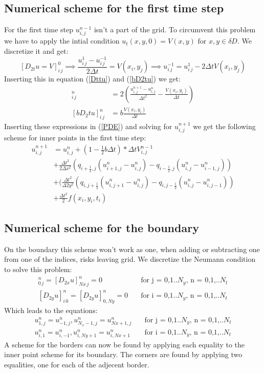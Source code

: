 \documentclass[twoside]{article}
\begin{document}
\subsection{Numerical scheme for the first time step}
For the first time step $u^{n-1}_{i,j}$ isn't a part of the grid. To circumvent this problem we have to apply the intial condition $u_t(x,y,0) = V(x,y) \text{ for } x,y \in \delta D$. We discretize it and get:
$$[D_{2t} u = V]_{i\,j}^0 \implies \frac{u_{i\,j}^1 - u_{i\,j}^{-1}}{2\Delta t} = V(x_i,y_j) \implies u_{i\,j}^{-1} = u_{i\,j}^{1} - 2\Delta t V(x_i,y_j)$$
Inserting this in equation (\ref{Dttu}) and (\ref{bD2tu}) we get:
\begin{align}
[D_t D_t u]_{i\, j}^n &= 2(\frac{u^{n+1}_{i,j} - u^{n}_{i,j}}{\Delta t^2}  - \frac{V(x_i,y_i)}{\Delta t}) \\
[bD_2t u]_{i\, j}^n &= b\frac{V(x_i,y_i)}{\Delta t} \label{bD2tu}
\end{align}
Inserting these expressions in (\ref{PDE}) and solving for $u^{n+1}_{i,j}$ we get the following scheme for inner points in the first time step:
\begin{align*}
u^{n+1}_{i,j} &= u^{n}_{i,j} + (1 - \frac{1}{2}b\Delta t)*\Delta t V^{n-1}_{i,j} \\
&+ \frac{\Delta t^2}{2\Delta x^2}({q_{i +\frac{1}{2},j}(u^{n}_{i+1,j} - u^{n}_{i,j}) - q_{i -\frac{1}{2},j}(u^{n}_{i,j} - u^{n}_{i-1,j})}) \\ 
&+  (\frac{\Delta t^2}{\Delta 2y^2} (q_{i,j +\frac{1}{2}}(u^{n}_{i,j+1} - u^{n}_{i,j}) - q_{i ,j-\frac{1}{2}}(u^{n}_{i,j} - u^{n}_{i,j-1}))\\
 &+ \frac{\Delta t^2}{2} f(x_i, y_i, t_i)
\end{align*}


\subsection{Numerical scheme for the boundary}
On the boundary this scheme won't work as one, when adding or subtracting one from one of the indices, risks leaving grid. We discretize the Neumann condition to solve this problem:
\begin{align}
[D_{2x} u]_{0\, j}^n = [D_{2x} u]_{Nx\, j}^n = 0 & \quad \text{for j = 0,1..$N_y$, n = 0,1,..$N_t$} \\
[D_{2y} u]_{i\, 0}^n = [D_{2y} u]_{0,Ny}^n = 0 & \quad \text{for i = 0,1..$N_y$, n = 0,1,..$N_t$}
\end{align}
Which leads to the equations:
\begin{align}
u_{1,j}^n = u_{-1,j}^n ,  u_{N_x-1,j}^n = u_{Nx+1,j}^n  & \quad \text{for j = 0,1..$N_y$, n = 0,1,..$N_t$} \\
u_{i,1}^n = u_{i,-1}^n, u_{i,Ny+1}^n = u_{i,Nx+1}^n & \quad \text{for i = 0,1..$N_y$, n = 0,1,..$N_t$}
\end{align}
A scheme for the borders can now be found by applying each equality to the inner point scheme for its boundary. The corners are found by applying two equalities, one for each of the adjecent border.
\end{document}
